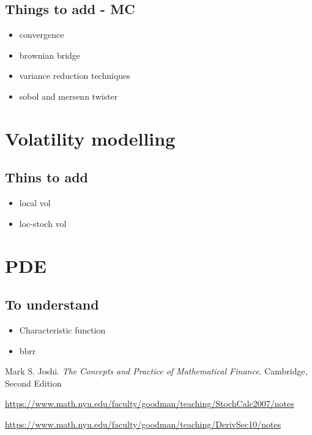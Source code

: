 \documentclass{report}
\begin{document}
\chapter{Things to add - MC}
\begin{itemize}
	\item convergence
	\item brownian bridge
	\item variance reduction techniques
	\item sobol and mersenn twister
\end{itemize}

\part{Volatility modelling}

\chapter{Thins to add}
\begin{itemize}
	\item local vol
	\item loc-stoch vol
\end{itemize}

\part{PDE}

\chapter{To understand}
\begin{itemize}
	\item Characteristic function
	\item bbrr
\end{itemize}

\begin{thebibliography}{9}
	Mark S. Joshi.
	\textit{The Concepts and Practice of Mathematical Finance}.
	Cambridge, Second Edition
	
	\href{url}{https://www.math.nyu.edu/faculty/goodman/teaching/StochCalc2007/notes}
	
	\href{url}{https://www.math.nyu.edu/faculty/goodman/teaching/DerivSec10/notes}
\end{thebibliography}
\end{document}
